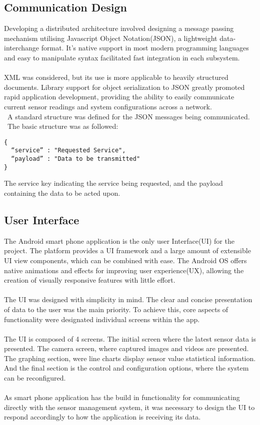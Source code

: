 \documentclass{article}
\begin{document}
\subsection{Communication Design}
Developing a distributed architecture involved designing a message passing mechanism utilising Javascript Object Notation(JSON), a lightweight data-interchange format. It’s native support in most modern programming languages and easy to manipulate syntax facilitated fast integration in each subsystem. \\\\
XML was considered, but its use is more applicable to heavily structured documents.  Library support for object serialization to JSON greatly promoted rapid application development, providing the ability to easily communicate current sensor readings and system configurations across a network. \\\ A standard structure was defined for the JSON messages being communicated. \\\ The basic structure was as followed: 
\begin{lstlisting}[caption={JSON Message Structure},label={lst:json_message}]
{ 
  “service” : "Requested Service",
  “payload” : "Data to be transmitted"
}
\end{lstlisting}

The service key indicating the service being requested, and the payload containing the data to be acted upon.

\subsection{User Interface}
The Android smart phone application is the only user Interface(UI) for the project. The platform provides a UI framework and a large amount of extensible UI view components, which can be combined with ease. The Android OS offers native animations and effects for improving user experience(UX), allowing the creation of visually responsive features with little effort. \\\\ The UI was designed with simplicity in mind. The clear and concise presentation of data to the user was the main priority. To achieve this, core aspects of functionality were designated individual screens within the app. \\\\ The UI is composed of 4 screens. The initial screen where the latest sensor data is presented. The camera screen, where captured images and videos are presented. The graphing section, were line charts display sensor value statistical information. And the final section is the control and configuration options, where the system can be reconfigured. \\\\ As smart phone application has the build in functionality for communicating directly with the sensor management system, it was necessary to design the UI to respond accordingly to how the application is receiving its data.
\end{document}
